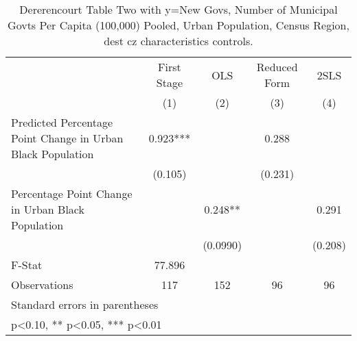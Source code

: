 \begin{table}[htbp]\centering
\def\sym#1{\ifmmode^{#1}\else\(^{#1}\)\fi}
\caption{Dererencourt Table Two with y=New Govs, Number of Municipal Govts Per Capita (100,000) Pooled, Urban Population, Census Region, dest cz characteristics controls.}
\begin{tabular}{l*{4}{c}}
\toprule
                    & First Stage   &         OLS   &Reduced Form   &        2SLS   \\
                    &\multicolumn{1}{c}{(1)}   &\multicolumn{1}{c}{(2)}   &\multicolumn{1}{c}{(3)}   &\multicolumn{1}{c}{(4)}   \\
\midrule
Predicted Percentage Point Change in Urban Black Population&       0.923***&               &       0.288   &               \\
                    &     (0.105)   &               &     (0.231)   &               \\
\addlinespace
Percentage Point Change in Urban Black Population&               &       0.248** &               &       0.291   \\
                    &               &    (0.0990)   &               &     (0.208)   \\
\midrule
F-Stat              &      77.896   &               &               &               \\
Observations        &         117   &         152   &          96   &          96   \\
\bottomrule
\multicolumn{5}{l}{\footnotesize Standard errors in parentheses}\\
\multicolumn{5}{l}{\footnotesize * p<0.10, ** p<0.05, *** p<0.01}\\
\end{tabular}
\end{table}
